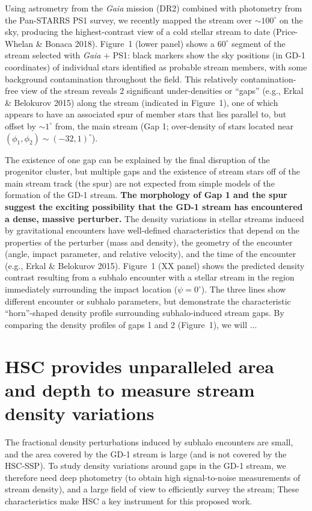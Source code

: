 \documentclass[11pt]{article}
\begin{document}
Using astrometry from the \textit{Gaia} mission (DR2) combined with photometry from the Pan-STARRS PS1 survey, we recently mapped the stream over $\sim 100^\circ$ on the sky, producing the highest-contrast view of a cold stellar stream to date (Price-Whelan \& Bonaca 2018).
Figure~1 (lower panel) shows a $60^\circ$ segment of the stream selected with \textit{Gaia} + PS1: black markers show the sky positions (in GD-1 coordinates) of individual stars identified as probable stream members, with some background contamination throughout the field.
This relatively contamination-free view of the stream reveals 2 significant under-densities or ``gaps'' (e.g., Erkal \& Belokurov 2015) along the stream (indicated in Figure~1), one of which appears to have an associated spur of member stars that lies parallel to, but offset by $\sim1^\circ$ from, the main stream (Gap 1; over-density of stars located near $(\phi_1, \phi_2) \sim (-32, 1)^\circ$).

The existence of one gap can be explained by the final disruption of the progenitor cluster, but multiple gaps and the existence of stream stars off of the main stream track (the spur) are not expected from simple models of the formation of the GD-1 stream.
\textbf{The morphology of Gap 1 and the spur suggest the exciting possibility that the GD-1 stream has encountered a dense, massive perturber.}
The density variations in stellar streams induced by gravitational encounters have well-defined characteristics that depend on the properties of the perturber (mass and density), the geometry of the encounter (angle, impact parameter, and relative velocity), and the time of the encounter (e.g., Erkal \& Belokurov 2015).
Figure~1 (XX panel) shows the predicted density contrast resulting from a subhalo encounter with a stellar stream in the region immediately surrounding the impact location ($\psi = 0^\circ$).
The three lines show different encounter or subhalo parameters, but demonstrate the characteristic ``horn''-shaped density profile surrounding subhalo-induced stream gaps.
By comparing the density profiles of gaps 1 and 2 (Figure~1), we will ...

\section*{HSC provides unparalleled area and depth to measure stream density variations}

The fractional density perturbations induced by subhalo encounters are small, and the area covered by the GD-1 stream is large (and is not covered by the HSC-SSP).
To study density variations around gaps in the GD-1 stream, we therefore need deep photometry (to obtain high signal-to-noise measurements of stream density), and a large field of view to efficiently survey the stream;
These characteristics make HSC a key instrument for this proposed work.
\end{document}
